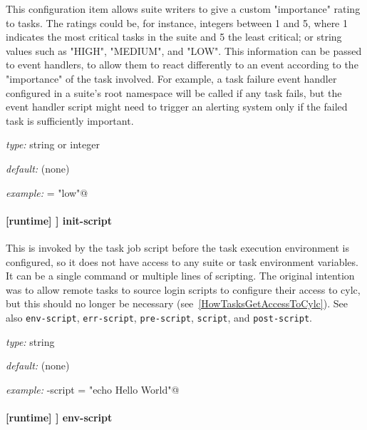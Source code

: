 This configuration item allows suite writers to give a custom "importance" 
rating to tasks.  The ratings could be, for instance, integers between 1 and 5,
where 1 indicates the most critical tasks in the suite and 5 the least
critical; or string values such as "HIGH", "MEDIUM", and "LOW".   This
information can be passed to event handlers, to allow them to react differently
to an event according to the "importance" of the task involved.  For example, a
task failure event handler configured in a suite's root namespace will be
called if any task fails, but the event handler script might need to trigger an
alerting system only if the failed task is sufficiently important.

\begin{myitemize}
\item {\em type:} string or integer
\item {\em default:} (none)
\item {\em example:} \lstinline@importance = "low"@
\end{myitemize}

\paragraph[init-script]{[runtime] \textrightarrow [[\_\_NAME\_\_]] \textrightarrow init-script}

This is invoked by the task job script before the task execution
environment is configured, so it does not have access to any suite or task
environment variables. It can be a single command or multiple lines of
scripting. The original intention was to allow remote tasks to
source login scripts to configure their access to cylc, but this should no
longer be necessary (see~\ref{HowTasksGetAccessToCylc}). See also
\lstinline=env-script=, \lstinline=err-script=, \lstinline=pre-script=,
\lstinline=script=, and \lstinline=post-script=.

\begin{myitemize}
\item {\em type:} string
\item {\em default:} (none)
\item {\em example:} \lstinline@init-script = "echo Hello World"@
\end{myitemize}

\paragraph[env-script]{[runtime] \textrightarrow [[\_\_NAME\_\_]] \textrightarrow env-script}

